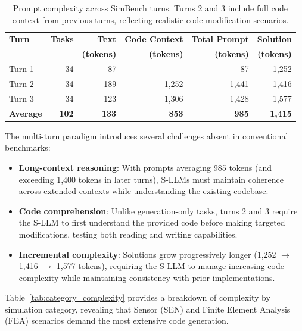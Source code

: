 \begin{table}[h!]
    \centering
    \caption{Prompt complexity across SimBench turns. Turns 2 and 3 include full code context from previous turns, reflecting realistic code modification scenarios.}
    \label{tab:turn_complexity}
    \begin{tabular}{l r r r r r}
        \toprule
        \textbf{Turn} & \textbf{Tasks} & \textbf{Text} & \textbf{Code Context} & \textbf{Total Prompt} & \textbf{Solution} \\
        & & \textbf{(tokens)} & \textbf{(tokens)} & \textbf{(tokens)} & \textbf{(tokens)} \\
        \midrule
        Turn 1 & 34 & 87 & --- & 87 & 1,252 \\
        Turn 2 & 34 & 189 & 1,252 & 1,441 & 1,416 \\
        Turn 3 & 34 & 123 & 1,306 & 1,428 & 1,577 \\
        \midrule
        \textbf{Average} & \textbf{102} & \textbf{133} & \textbf{853} & \textbf{985} & \textbf{1,415} \\
        \bottomrule
    \end{tabular}
\end{table}

The multi-turn paradigm introduces several challenges absent in conventional benchmarks:
\begin{itemize}
    \item \textbf{Long-context reasoning}: With prompts averaging 985 tokens (and exceeding 1,400 tokens in later turns), S-LLMs must maintain coherence across extended contexts while understanding the existing codebase.
    \item \textbf{Code comprehension}: Unlike generation-only tasks, turns 2 and 3 require the S-LLM to first understand the provided code before making targeted modifications, testing both reading and writing capabilities.
    \item \textbf{Incremental complexity}: Solutions grow progressively longer (1,252 $\rightarrow$ 1,416 $\rightarrow$ 1,577 tokens), requiring the S-LLM to manage increasing code complexity while maintaining consistency with prior implementations.
\end{itemize}

Table~\ref{tab:category_complexity} provides a breakdown of complexity by simulation category, revealing that Sensor (SEN) and Finite Element Analysis (FEA) scenarios demand the most extensive code generation.

